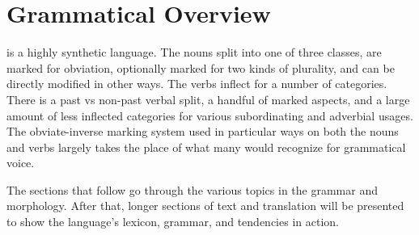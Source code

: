 \section{Grammatical Overview}
\langname is a highly synthetic language. The nouns split into one of three classes, are marked for obviation, optionally marked for two kinds of plurality, and can be directly modified in other ways. The verbs inflect for a number of categories. There is a past vs non-past verbal split, a handful of marked aspects, and a large amount of less inflected categories for various subordinating and adverbial usages. The obviate-inverse marking system used in particular ways on both the nouns and verbs largely takes the place of what many would recognize for grammatical voice.
\par
The sections that follow go through the various topics in the grammar and morphology. After that, longer sections of text and translation will be presented to show the language's lexicon, grammar, and tendencies in action.
